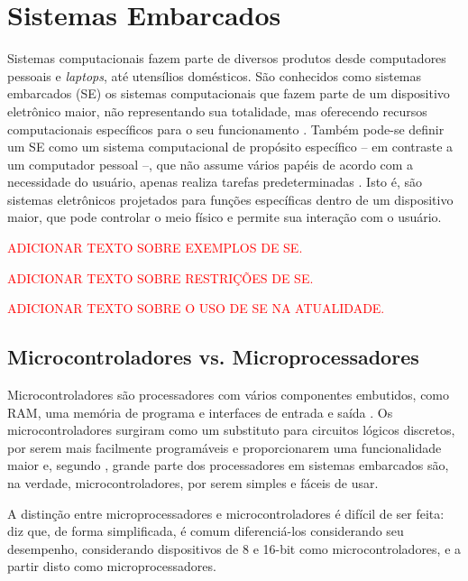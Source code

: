 \section{Sistemas Embarcados}
\label{sec:embarcados}
Sistemas computacionais fazem parte de diversos produtos desde computadores pessoais e \textit{laptops}, até utensílios domésticos. São conhecidos como sistemas embarcados (SE) os sistemas computacionais que fazem parte de um dispositivo eletrônico maior, não representando sua totalidade, mas oferecendo recursos computacionais específicos para o seu funcionamento \cite{vahid:2002}. Também pode-se definir um SE como um sistema computacional de propósito específico -- em contraste a um computador pessoal --, que não assume vários papéis de acordo com a necessidade do usuário, apenas realiza tarefas predeterminadas \cite{heath:2002}. Isto é, são sistemas eletrônicos projetados para funções específicas dentro de um dispositivo maior, que pode controlar o meio físico e permite sua interação com o usuário.

\textcolor{red}{ADICIONAR TEXTO SOBRE EXEMPLOS DE SE.}

\textcolor{red}{ADICIONAR TEXTO SOBRE RESTRIÇÕES DE SE.}

\textcolor{red}{ADICIONAR TEXTO SOBRE O USO DE SE NA ATUALIDADE.}


\subsection{Microcontroladores vs. Microprocessadores}
Microcontroladores são processadores com vários componentes embutidos, como RAM, uma memória de programa e interfaces de entrada e saída \cite{white:2011}. Os microcontroladores surgiram como um substituto para circuitos lógicos discretos, por serem mais facilmente programáveis e proporcionarem uma funcionalidade maior \cite{heath:2002} e, segundo , grande parte dos processadores em sistemas embarcados são, na verdade, microcontroladores, por serem simples e fáceis de usar.

A distinção entre microprocessadores e microcontroladores é difícil de ser feita:  diz que, de forma simplificada, é comum diferenciá-los considerando seu desempenho, considerando dispositivos de 8 e 16-bit como microcontroladores, e a partir disto como microprocessadores.


